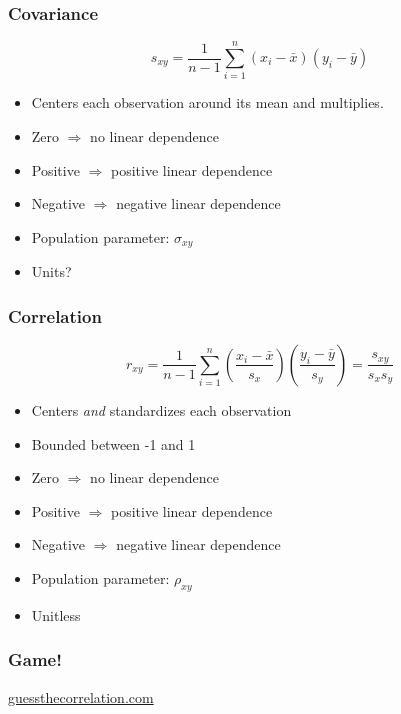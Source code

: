 \documentclass{beamer}
\begin{document}
\begin{frame}
\frametitle{Covariance}
	$$
	s_{xy} = \frac{1}{n-1} \sum_{i=1}^n (x_i -\bar{x})(y_i - \bar{y})
	$$
	\begin{itemize}
		\item Centers each observation around its mean and multiplies.
		\item Zero $\Rightarrow$ no linear dependence
		\item Positive $\Rightarrow$ positive linear dependence
		\item Negative $\Rightarrow$ negative linear dependence
		\item Population parameter: $\sigma_{xy}$
		\item Units?
	\end{itemize}
\end{frame}

\begin{frame}
\frametitle{Correlation}
	$$
	r_{xy} = \frac{1}{n - 1} \sum_{i = 1}^n \left(\frac{x_i  - \bar{x}}{s_x}\right)\left(\frac{y_i - \bar{y}}			{s_y}\right) = \frac{s_{xy}}{s_x s_y}
	$$
	\begin{itemize}
		\item Centers \emph{and} standardizes each observation 
		\item Bounded between -1 and 1
		\item Zero $\Rightarrow$ no linear dependence
		\item Positive $\Rightarrow$ positive linear dependence
		\item Negative $\Rightarrow$ negative linear dependence
		\item Population parameter: $\rho_{xy}$
		\item Unitless
	\end{itemize}
\end{frame}

\begin{frame}
\frametitle{Game!}
	\url{guessthecorrelation.com}
\end{frame}
\end{document}
